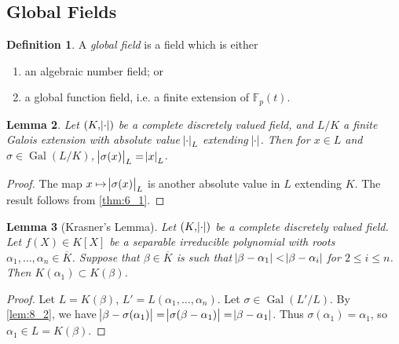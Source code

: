 \documentclass[11pt]{article}
\theoremstyle{definition}
\newtheorem{definition}{Definition}[subsection]
\theoremstyle{plain}
\newtheorem{lemma}[definition]{Lemma}
\theoremstyle{remark}
\DeclareMathOperator{\Gal}{Gal}
\newcommand{\FF}{\mathbb{F}}
\begin{document}
\subsection{Global Fields}

\begin{definition}\label{def:8_1}
    A \emph{global field} is a field which is either
    \begin{enumerate}
        \item an algebraic number field; or
        \item a global function field, i.e. a finite extension of $\FF_p(t)$.
    \end{enumerate}
\end{definition}

\begin{lemma}\label{lem:8_2}
    Let $(K, \abs{\cdot})$ be a complete discretely valued field, and $L/K$ a finite Galois extension with absolute value $\abs{\cdot}_L$ extending $\abs{\cdot}$. Then for $x \in L$ and $\sigma \in \Gal(L/K)$, $\abs{\sigma(x)}_L = \abs{x}_L$.
\end{lemma}
\begin{proof}
    The map $x \mapsto \abs{\sigma(x)}_L$ is another absolute value in $L$ extending $K$. The result follows from \autoref{thm:6_1}.
\end{proof}

\begin{lemma}[Krasner's Lemma]\label{lem:8_3}
    Let $(K, \abs{\cdot})$ be a complete discretely valued field. Let $f(X) \in K[X]$ be a separable irreducible polynomial with roots $\alpha_1, \ldots, \alpha_n \in \overline{K}$. Suppose that $\beta \in \overline{K}$ is such that $\abs{\beta - \alpha_1} < \abs{\beta - \alpha_i}$ for $2 \le i \le n$. Then $K(\alpha_1) \subset K(\beta)$.
\end{lemma}
\begin{proof}
    Let $L = K(\beta)$, $L' = L(\alpha_1, \ldots, \alpha_n)$. Let $\sigma \in \Gal(L' / L)$. By \autoref{lem:8_2}, we have $\abs{\beta - \sigma(\alpha_1)} = \abs{\sigma(\beta - \alpha_1)} = \abs{\beta - \alpha_1}$. Thus $\sigma(\alpha_1) = \alpha_1$, so $\alpha_1 \in L = K(\beta)$.
\end{proof}
\end{document}
